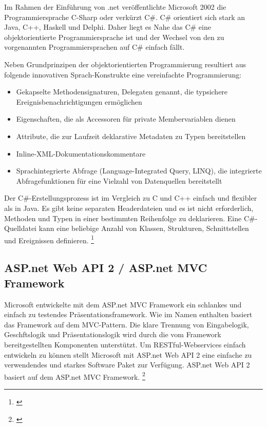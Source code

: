 Im Rahmen der Einführung von .net veröffentlichte Microsoft 2002 die
Programmiersprache C-Sharp oder verkürzt C\#. C\# orientiert sich stark
an Java, C++, Haskell und Delphi. Daher liegt es Nahe das C\# eine
objektorientierte Programmiersprache ist und der Wechsel von den zu
vorgenannten Programmiersprachen auf C\# einfach fällt.

Neben Grundprinzipen der objektorientierten Programmierung resultiert
aus folgende innovativen Sprach-Konstrukte eine vereinfachte
Programmierung:

\begin{itemize}
\tightlist
\item
  Gekapselte Methodensignaturen, Delegaten genannt, die typsichere
  Ereignisbenachrichtigungen ermöglichen
\item
  Eigenschaften, die als Accessoren für private Membervariablen dienen
\item
  Attribute, die zur Laufzeit deklarative Metadaten zu Typen
  bereitstellen
\item
  Inline-XML-Dokumentationskommentare
\item
  Sprachintegrierte Abfrage (Language-Integrated Query, LINQ), die
  integrierte Abfragefunktionen für eine Vielzahl von Datenquellen
  bereitstellt
\end{itemize}

Der C\#-Erstellungsprozess ist im Vergleich zu C und C++ einfach und
flexibler als in Java. Es gibt keine separaten Headerdateien und es ist
nicht erforderlich, Methoden und Typen in einer bestimmten Reihenfolge
zu deklarieren. Eine C\#-Quelldatei kann eine beliebige Anzahl von
Klassen, Strukturen, Schnittstellen und Ereignissen definieren.
\footnote{\autocite{csharpbasic}}

\newpage

\subsection{ASP.net Web API 2 / ASP.net MVC
Framework}\label{asp.net-web-api-2-asp.net-mvc-framework}

Microsoft entwickelte mit dem ASP.net MVC Framework ein schlankes und
einfach zu testendes Präsentationsframework. Wie im Namen enthalten
basiert das Framework auf dem MVC-Pattern. Die klare Trennung von
Eingabelogik, Geschftslogik und Präsentationslogik wird durch die vom
Framework bereitgestellten Komponenten unterstützt. Um
RESTful-Webservices einfach entwickeln zu können stellt Microsoft mit
ASP.net Web API 2 eine einfache zu verwendendes und starkes Software
Paket zur Verfügung. ASP.net Web API 2 basiert auf dem ASP.net MVC
Framework. \footnote{\autocite{csharpbasic}}

